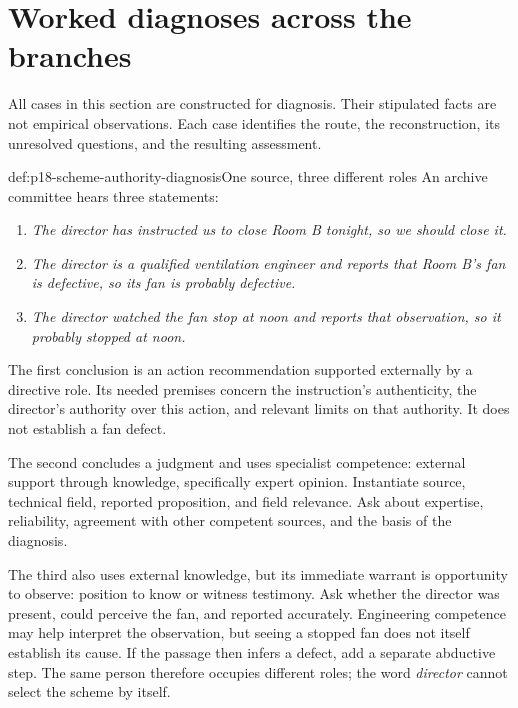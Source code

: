 \section{Worked diagnoses across the branches}
\label{sec:p18-scheme-diagnosis-cases}

All cases in this section are constructed for diagnosis.
Their stipulated facts are not empirical observations.
Each case identifies the route, the reconstruction, its unresolved
questions, and the resulting assessment.

\begin{hbexample}{def:p18-scheme-authority-diagnosis}{One source, three different roles}
An archive committee hears three statements:
\begin{enumerate}
\item \emph{The director has instructed us to close Room B tonight,
so we should close it.}
\item \emph{The director is a qualified ventilation engineer and
reports that Room B's fan is defective, so its fan is probably defective.}
\item \emph{The director watched the fan stop at noon and reports
that observation, so it probably stopped at noon.}
\end{enumerate}
The first conclusion is an action recommendation supported externally
by a directive role. Its needed premises concern the instruction's
authenticity, the director's authority over this action, and relevant
limits on that authority. It does not establish a fan defect.

The second concludes a judgment and uses specialist competence:
external support through knowledge, specifically expert opinion.
Instantiate source, technical field, reported proposition, and
field relevance. Ask about expertise, reliability, agreement with
other competent sources, and the basis of the diagnosis.

The third also uses external knowledge, but its immediate warrant
is opportunity to observe: position to know or witness testimony.
Ask whether the director was present, could perceive the fan,
and reported accurately. Engineering competence may help interpret
the observation, but seeing a stopped fan does not itself establish
its cause. If the passage then infers a defect, add a separate
abductive step. The same person therefore occupies different roles;
the word \emph{director} cannot select the scheme by itself.
\end{hbexample}

